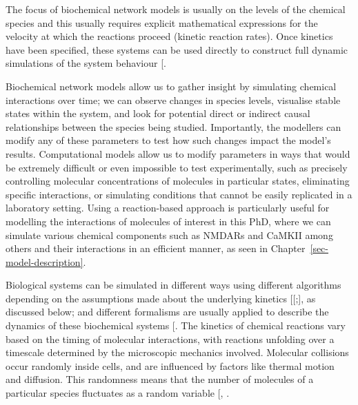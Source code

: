 \documentclass[
  11pt,
  letterpaper,
]{scrreprt}
\begin{document}
The focus of biochemical network models is usually on the levels of the
chemical species and this usually requires explicit mathematical
expressions for the velocity at which the reactions proceed (kinetic
reaction rates). Once kinetics have been specified, these systems can be
used directly to construct full dynamic simulations of the system
behaviour {[}\citeproc{ref-cook2009Programmability}{266}{]}.

Biochemical network models allow us to gather insight by simulating
chemical interactions over time; we can observe changes in species
levels, visualise stable states within the system, and look for
potential direct or indirect causal relationships between the species
being studied. Importantly, the modellers can modify any of these
parameters to test how such changes impact the model's results.
Computational models allow us to modify parameters in ways that would be
extremely difficult or even impossible to test experimentally, such as
precisely controlling molecular concentrations of molecules in
particular states, eliminating specific interactions, or simulating
conditions that cannot be easily replicated in a laboratory setting.
Using a reaction-based approach is particularly useful for modelling the
interactions of molecules of interest in this PhD, where we can simulate
various chemical components such as NMDARs and CaMKII among others and
their interactions in an efficient manner, as seen in
Chapter~\ref{sec-model-description}.

Biological systems can be simulated in different ways using different
algorithms depending on the assumptions made about the underlying
kinetics {[}{[}\citeproc{ref-resat2009Kinetic}{268}{]};{]}, as discussed
below; and different formalisms are usually applied to describe the
dynamics of these biochemical systems
{[}\citeproc{ref-marchetti2017Simulation}{269}{]}. The kinetics of
chemical reactions vary based on the timing of molecular interactions,
with reactions unfolding over a timescale determined by the microscopic
mechanics involved. Molecular collisions occur randomly inside cells,
and are influenced by factors like thermal motion and diffusion. This
randomness means that the number of molecules of a particular species
fluctuates as a random variable
{[},
\citeproc{ref-earnest2018Simulating}{271}{]}.
\end{document}
